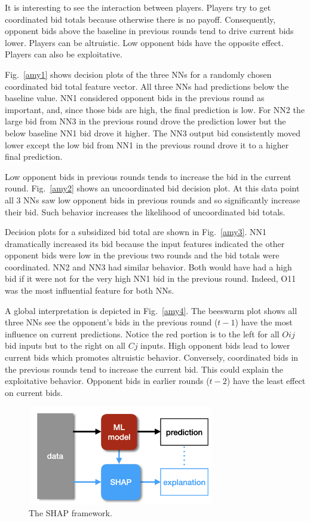 \documentclass[journal]{IEEEtran} %
\begin{document}
It is interesting to see the interaction between players. Players try to get coordinated bid totals because otherwise there is no payoff. Consequently, opponent bids above the baseline in previous rounds tend to drive current bids lower. Players can be altruistic. Low opponent bids have the opposite effect. Players can also be exploitative. 


Fig.~\ref{amy1} shows decision plots of the three NNs for a randomly chosen coordinated bid total feature vector. All three NNs had predictions below the baseline value. NN1 considered opponent bids in the previous round as important, and, since those bids are high, the final prediction is low. For NN2 the large bid from NN3 in the previous round drove the prediction lower but the below baseline NN1 bid drove it higher. The NN3 output bid consistently moved lower except the low bid from NN1 in the previous round drove it to a higher final prediction. 

Low opponent bids in previous rounds tends to increase the bid in the current round. Fig.~\ref{amy2} shows an uncoordinated bid decision plot.  At this data point all 3 NNs saw low opponent bids in previous rounds and so significantly increase their bid. Such behavior increases the likelihood of uncoordinated bid totals. 

Decision plots for a subsidized bid total are shown in Fig.~\ref{amy3}. NN1 dramatically increased its bid because the input features indicated the other opponent bids were low in the previous two rounds and the bid totals were coordinated. NN2 and NN3 had similar behavior. Both would have had a high bid if it were not for the very high NN1 bid in the previous round. Indeed, O11 was the most influential feature for both NNs. 

A global interpretation is depicted in Fig.~\ref{amy4}. The beeswarm plot shows all three NNs see the opponent's bids in the previous round ($t-1$) have the most influence on current predictions. Notice the red portion is to the left for all $Oij$ bid inputs but to the right on all $Cj$ inputs. High opponent bids lead to lower current bids which promotes altruistic behavior. Conversely, coordinated bids in the previous rounds tend to increase the current bid. This could explain the exploitative behavior. Opponent bids in earlier rounds ($t-2$) have the least effect on current bids.

\begin{figure}[!t]
\centerline{\includegraphics[width=8.2cm,height=4.3cm]{SHAP.png}}
\caption{The SHAP framework.}
\label{lidija1}
\end{figure}
\end{document}
